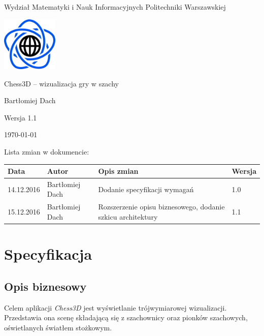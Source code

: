 \documentclass[10pt,a4paper]{article}
\begin{document}
\begin{titlepage}
	\centering
	{\Large Wydział Matematyki i Nauk Informacyjnych Politechniki Warszawskiej \par}
	\vspace{1cm}
	\includegraphics[width=0.2\textwidth]{logo.png} \par
	\vspace{5cm}
	{\LARGE Chess3D -- wizualizacja gry w szachy \par}
	\vspace{0.5cm}
	{\Large Bartłomiej Dach \par}
	\vspace{1.5cm}
	{\Large Wersja 1.1 \par}
	\vspace{1.5cm}
	{\Large \today \par}
\end{titlepage}
Lista zmian w dokumencie:
\begin{table}[H]
\def\arraystretch{1.5}
\begin{tabularx}{\textwidth}{|l|l|X|l|}
	\hline
	\textbf{Data} & \textbf{Autor} & \textbf{Opis zmian} & \textbf{Wersja} \\
	\hline
	14.12.2016 & Bartłomiej Dach & Dodanie specyfikacji wymagań & 1.0 \\
	\hline
	15.12.2016 & Bartłomiej Dach & Rozszerzenie opisu biznesowego, dodanie szkicu architektury & 1.1 \\
	\hline
\end{tabularx}
\end{table}

\tableofcontents
\newpage

\section{Specyfikacja}

\subsection{Opis biznesowy}
Celem aplikacji \emph{Chess3D} jest wyświetlanie trójwymiarowej wizualizacji. Przedstawia ona scenę składającą się z szachownicy oraz pionków szachowych, oświetlanych światłem stożkowym.
\end{document}
